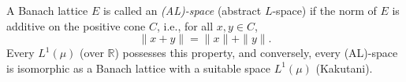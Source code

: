 A Banach lattice $E$ is called an \emph{(AL)-space} (abstract $L$-space) if the norm of $E$ is additive on the positive cone $C$, i.e., for all $x, y \in C$,
$$
\|x + y\| = \|x\| + \|y\|.
$$
Every $L^1(\mu)$ (over $\mathbb{R}$) possesses this property, and conversely, every (AL)-space is isomorphic as a Banach lattice with a suitable space $L^1(\mu)$ (Kakutani).
